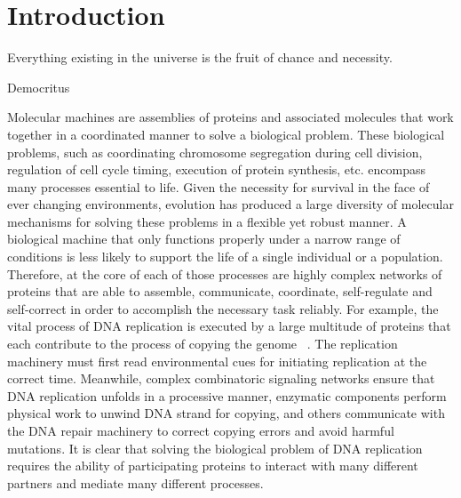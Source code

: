 \chapter{Introduction}


\epigraph{Everything existing in the universe is the fruit of chance and necessity.}{Democritus}

Molecular  machines  are  assemblies of proteins and associated molecules that  work together  in a coordinated manner  to solve a biological problem.  These biological problems, such as coordinating chromosome segregation  during cell division, regulation of cell cycle timing, execution of protein  synthesis, etc.  encompass many processes essential to life. Given the necessity for survival in the face of ever changing environments,  evolution has produced a large diversity of molecular mechanisms for solving these problems in a flexible yet robust  manner.  A biological machine that  only functions properly under a narrow range of  conditions is less likely to support the life of a single individual or a population.  Therefore,  at the core of each of those processes are highly complex networks of proteins that  are able to assemble, communicate, coordinate,  self-regulate and self-correct in order to accomplish the necessary task reliably.  For example, the vital process of DNA replication is executed by a large multitude of proteins that  each contribute to the process of copying the genome ~\cite{bell2002dna}. The replication  machinery must first read environmental  cues for initiating  replication  at the correct time. Meanwhile, complex combinatoric  signaling networks ensure that  DNA replication  unfolds in a processive manner,  enzymatic components  perform physical work to unwind DNA strand  for copying, and others  communicate  with the DNA repair machinery  to correct copying errors and avoid harmful mutations. It is clear that  solving the biological problem of DNA replication requires the ability of participating proteins to interact  with many different partners  and mediate  many different processes.


